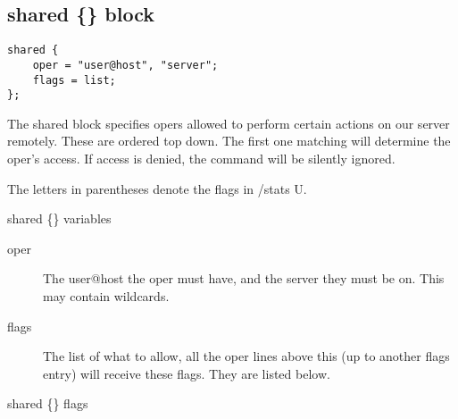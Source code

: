 \subsection{shared \{\} block}

\begin{verbatim}
shared {
	oper = "user@host", "server";
	flags = list;
};\end{verbatim}

	The shared block specifies opers allowed to perform certain actions
	on our server remotely.
	These are ordered top down. The first one matching will determine
	the oper's access.
	If access is denied, the command will be silently ignored.

	The letters in parentheses denote the flags in /stats U.


{\sc shared \{\} variables}
\nopagebreak

\noindent
\begin{description}
\item[{oper}]
	The user@host the oper must have, and the server they must be on. This
	may contain wildcards.

\item[{flags}]
	The list of what to allow, all the oper lines above this (up to another
	flags entry) will receive these flags. They are listed below.

\end{description}

{\sc shared \{\} flags}
\nopagebreak

